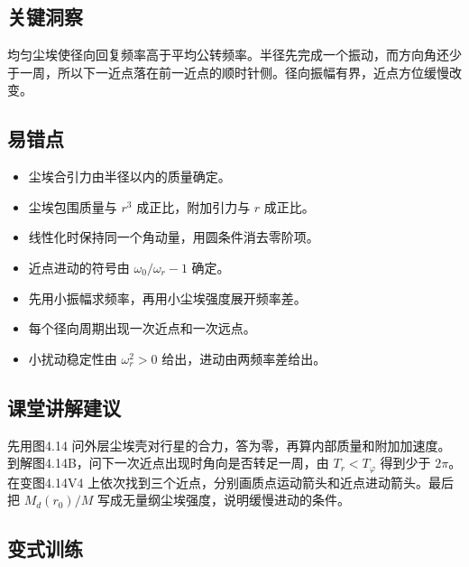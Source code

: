\documentclass[UTF8,fontset=fandol,a4paper,11pt]{ctexart}
\begin{document}

\subsection*{关键洞察}

均匀尘埃使径向回复频率高于平均公转频率。半径先完成一个振动，而方向角还少于一周，所以下一近点落在前一近点的顺时针侧。径向振幅有界，近点方位缓慢改变。



\subsection*{易错点}

\begin{itemize}
\item 尘埃合引力由半径以内的质量确定。
\item 尘埃包围质量与 $r^3$ 成正比，附加引力与 $r$ 成正比。
\item 线性化时保持同一个角动量，用圆条件消去零阶项。
\item 近点进动的符号由 $\omega_0/\omega_r-1$ 确定。
\item 先用小振幅求频率，再用小尘埃强度展开频率差。
\item 每个径向周期出现一次近点和一次远点。
\item 小扰动稳定性由 $\omega_r^2>0$ 给出，进动由两频率差给出。
\end{itemize}



\subsection*{课堂讲解建议}

先用图4.14 问外层尘埃壳对行星的合力，答为零，再算内部质量和附加加速度。到解图4.14B，问下一次近点出现时角向是否转足一周，由 $T_r<T_\varphi$ 得到少于 $2\pi$。在变图4.14V4 上依次找到三个近点，分别画质点运动箭头和近点进动箭头。最后把 $M_d(r_0)/M$ 写成无量纲尘埃强度，说明缓慢进动的条件。



\subsection*{变式训练}
\end{document}
